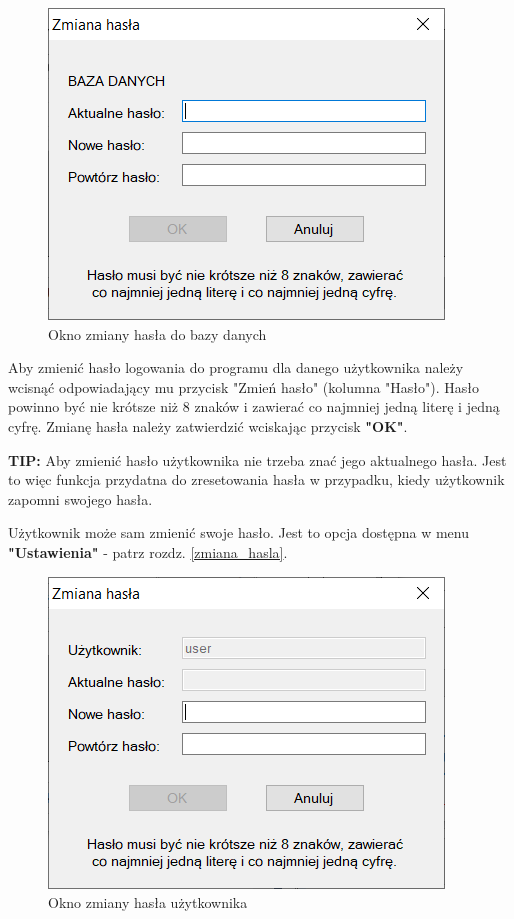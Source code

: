\begin{figure}[htb]
	\centering
	\includegraphics{obrazki/Logowanie/zmiana_hasla_bazy.png}
	\caption{Okno zmiany hasła do bazy danych}
	\label{zmianaHaslaBazy}
\end{figure}

Aby zmienić hasło logowania do programu dla danego użytkownika należy wcisnąć odpowiadający mu przycisk "Zmień hasło" (kolumna "Hasło"). Hasło powinno być nie krótsze niż 8 znaków i zawierać co najmniej jedną literę i jedną cyfrę. Zmianę hasła należy zatwierdzić wciskając przycisk \textbf{"OK"}.

\textbf{TIP:} Aby zmienić hasło użytkownika nie trzeba znać jego aktualnego hasła. Jest to więc funkcja przydatna do zresetowania hasła w przypadku, kiedy użytkownik zapomni swojego hasła.

Użytkownik może sam zmienić swoje hasło. Jest to opcja dostępna w menu \textbf{"Ustawienia"} - patrz rozdz. \ref{zmiana_hasla}. 

\begin{figure}[H]
	\centering
	\includegraphics{obrazki/Logowanie/zmiana_hasla_uzytkownika.png}
	\caption{Okno zmiany hasła użytkownika}
	\label{zmianaHaslaUzytkownika}
\end{figure}
